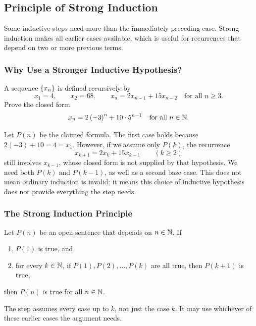 \subsection{Principle of Strong Induction}
Some inductive steps need more than the immediately preceding case. Strong
induction makes all earlier cases available, which is useful for recurrences
that depend on two or more previous terms.

\subsubsection{Why Use a Stronger Inductive Hypothesis?}
\begin{example}
    A sequence $\left\{x_n\right\}$ is defined recursively by
    \[
        x_1=4,\qquad x_2=68,\qquad
        x_n=2x_{n-1}+15x_{n-2}\quad\text{for all }n\geq3.
    \]
    Prove the closed form
    \[
        x_n=2\left(-3\right)^n+10\cdot5^{n-1}
        \quad\text{for all }n\in\mathbb{N}.
    \]
\end{example}
Let $P(n)$ be the claimed formula. The first case holds because
$2(-3)+10=4=x_1$. However, if we assume only $P(k)$, the recurrence
\[
    x_{k+1}=2x_k+15x_{k-1}\qquad(k\geq2)
\]
still involves $x_{k-1}$, whose closed form is not supplied by that
hypothesis. We need both $P(k)$ and $P(k-1)$, as well as a second base case.
This does not mean ordinary induction is invalid; it means this choice of
inductive hypothesis does not provide everything the step needs.

\subsubsection{The Strong Induction Principle}
\begin{definition}
    Let $P(n)$ be an open sentence that depends on $n\in\mathbb{N}$. If
    \begin{enumerate}[label=(\arabic*)]
        \item $P(1)$ is true, and
        \item for every $k\in\mathbb{N}$, if $P(1),P(2),\ldots,P(k)$ are
        all true, then $P(k+1)$ is true,
    \end{enumerate}
    then $P(n)$ is true for all $n\in\mathbb{N}$.
\end{definition}
The step assumes every case up to $k$, not just the case $k$. It may use
whichever of these earlier cases the argument needs.

